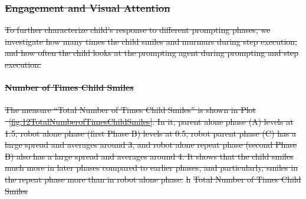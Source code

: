 \documentclass{ut-thesis}
\providecommand{\DIFdeltex}[1]{{\protect\color{red}\sout{#1}}}                      %
\providecommand{\DIFdelFL}[1]{\DIFdel{#1}} %
\providecommand{\DIFdel}[1]{\texorpdfstring{\DIFdeltex{#1}}{}} %
\begin{document}
\subsubsection{\DIFdel{Engagement and Visual Attention}}
\addtocounter{subsubsection}{-1}%
\DIFdel{To further characterize child's response to different prompting phases, we investigate how many times the child smiles and murmurs during step execution, and how often the child looks at the prompting agent during prompting and step execution.
}%

\paragraph{\DIFdel{Number of Times Child Smiles}}
\addtocounter{paragraph}{-1}%
\DIFdel{The measure ``Total Number of Times Child Smiles'' is shown in Plot \ \ref{fig:12TotalNumberofTimesChildSmiles}.  In it, parent alone phase (A) levels at 1.5, robot alone phase (first Phase B) levels at 0.5, robot parent phase (C) has a large spread and averages around 3, and robot alone repeat phase (second Phase B) also has a large spread and averages around 4.  It shows that the child smiles much more in later phases compared to earlier phases, and particularly, smiles in the repeat phase more than in robot alone phase.
}%
\DIFdelFL{h}%
{%
\DIFdelFL{Total Number of Times Child Smiles}}

\end{document}
